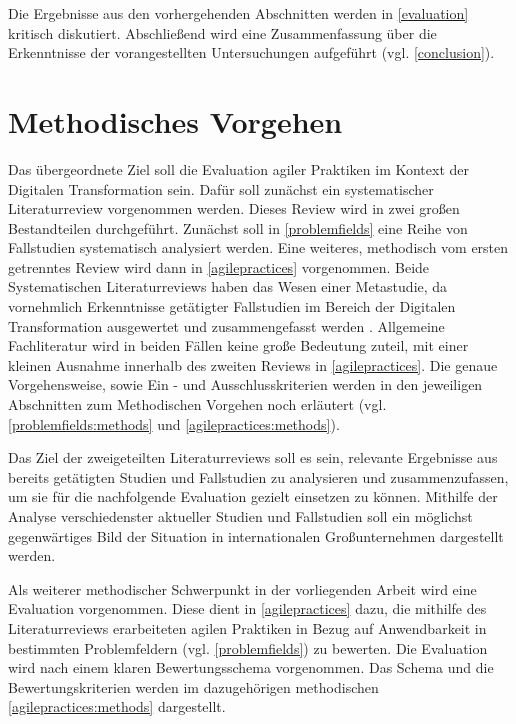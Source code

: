 Die Ergebnisse aus den vorhergehenden Abschnitten werden in \ref{evaluation} kritisch diskutiert. Abschließend wird eine Zusammenfassung über die Erkenntnisse der vorangestellten Untersuchungen aufgeführt (vgl. \ref{conclusion}).


\section{Methodisches Vorgehen}
\label{introduction:methods}


Das übergeordnete Ziel soll die Evaluation agiler Praktiken im Kontext der Digitalen Transformation sein. Dafür soll zunächst ein systematischer Literaturreview vorgenommen werden. Dieses Review wird in zwei großen Bestandteilen durchgeführt. Zunächst soll in \ref{problemfields} eine Reihe von Fallstudien systematisch analysiert werden. Eine weiteres, methodisch vom ersten getrenntes  Review wird dann in \ref{agilepractices} vorgenommen. Beide Systematischen Literaturreviews haben das Wesen einer Metastudie, da vornehmlich Erkenntnisse getätigter Fallstudien im Bereich der Digitalen Transformation ausgewertet und zusammengefasst werden  . Allgemeine Fachliteratur wird in beiden Fällen keine große Bedeutung zuteil, mit einer kleinen Ausnahme innerhalb des zweiten Reviews in \ref{agilepractices}. Die genaue Vorgehensweise, sowie Ein - und Ausschlusskriterien werden in den jeweiligen Abschnitten zum Methodischen Vorgehen noch erläutert (vgl. \ref{problemfields:methods} und \ref{agilepractices:methods}).

Das Ziel der zweigeteilten Literaturreviews soll es sein, relevante Ergebnisse aus bereits getätigten Studien und Fallstudien zu analysieren und zusammenzufassen, um sie für die nachfolgende Evaluation gezielt einsetzen zu können. Mithilfe der Analyse verschiedenster aktueller Studien und Fallstudien soll ein möglichst gegenwärtiges Bild der Situation in internationalen Großunternehmen dargestellt werden.

Als weiterer methodischer Schwerpunkt in der vorliegenden Arbeit wird eine Evaluation vorgenommen. Diese dient in \ref{agilepractices} dazu, die mithilfe des Literaturreviews erarbeiteten agilen Praktiken in Bezug auf Anwendbarkeit in bestimmten Problemfeldern (vgl. \ref{problemfields}) zu bewerten. Die Evaluation wird nach einem klaren Bewertungsschema vorgenommen. Das Schema und die Bewertungskriterien werden im dazugehörigen methodischen \ref{agilepractices:methods} dargestellt.

